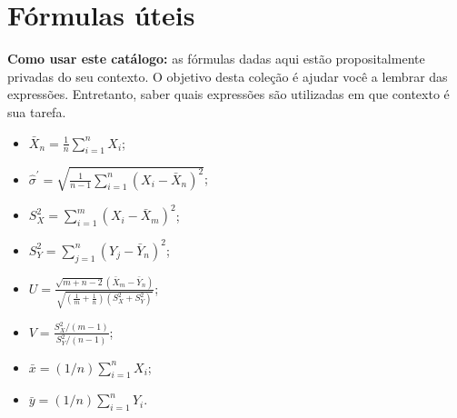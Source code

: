 \documentclass[a4paper,10pt, notitlepage]{report}
\begin{document}
\section*{Fórmulas úteis}
\textbf{Como usar este catálogo:} as fórmulas dadas aqui estão propositalmente privadas do seu contexto.
O objetivo desta coleção é ajudar você a lembrar das expressões.
Entretanto, saber quais expressões são utilizadas em que contexto é sua tarefa.
\begin{itemize}
 \item $ \bar{X}_n = \frac{1}{n} \sum_{i=1}^n X_i$;
 \item $\hat{\sigma}^\prime = \sqrt{\frac{1}{n-1}\sum_{i=1}^n \left(X_i - \bar{X}_n\right)^2}$;
 \item $S_X^2 = \sum_{i=1}^m (X_i-\bar{X}_m)^2$;
 \item $S_Y^2 = \sum_{j=1}^n (Y_j-\bar{Y}_n)^2$;
 \item $U = \frac{\sqrt{m + n - 2}(\bar{X}_m - \bar{Y}_n)}{\sqrt{\left(\frac{1}{m} + \frac{1}{n}\right) (S_X^2 + S_Y^2)}}$;
 \item $ V = \frac{S_X^2/(m-1)}{S_Y^2/(n-1)}$;
 \item $\bar{x} = (1/n)\sum_{i=1}^n X_i$;
 \item $\bar{y} = (1/n)\sum_{i=1}^n Y_i$.
\end{itemize}


% 
% 
\end{document}

